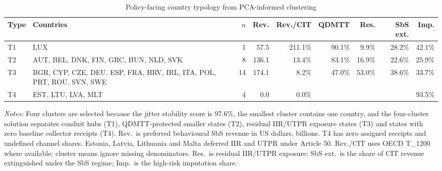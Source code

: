 \begin{table}[H]
\centering
\scriptsize
\setlength{\tabcolsep}{2pt}
\caption[Policy-facing country typology]{Policy-facing country typology from PCA-informed clustering}
\label{tab:country_typology_clusters}
\begin{adjustbox}{max width=\textwidth,center}
\begin{tabular}{@{}L{0.85cm}L{3.35cm}rrrrrrr@{}}
\toprule
Type & Countries & $n$ & Rev. & Rev./CIT & QDMTT & Res. & SbS ext. & Imp. \\
\midrule
T1 & LUX &  1 &  57.5 & 211.1\% & 90.1\% &  9.9\% & 28.2\% & 42.1\% \\
T2 & AUT, BEL, DNK, FIN, GRC, HUN, NLD, SVK &  8 & 136.1 &  13.4\% & 83.1\% & 16.9\% & 22.6\% & 25.9\% \\
T3 & BGR, CYP, CZE, DEU, ESP, FRA, HRV, IRL, ITA, POL, PRT, ROU, SVN, SWE & 14 & 174.1 &   8.2\% & 47.0\% & 53.0\% & 38.6\% & 33.7\% \\
T4 & EST, LTU, LVA, MLT &  4 &   0.0 &   0.0\% &  &  &  & 93.5\% \\
\bottomrule
\end{tabular}
\end{adjustbox}

\vspace{0.35em}
\noindent\begin{minipage}{\textwidth}
\footnotesize\raggedright\textit{Notes:} Four clusters are selected because the jitter stability score is 97.6\%, the smallest cluster contains one country, and the four-cluster solution separates conduit hubs (T1), QDMTT-protected smaller states (T2), residual IIR/UTPR exposure states (T3) and states with zero baseline collector receipts (T4). Rev.\ is preferred behavioural SbS revenue in US dollars, billions. T4 has zero assigned receipts and undefined channel shares. Estonia, Latvia, Lithuania and Malta deferred IIR and UTPR under Article 50. Rev./CIT uses OECD T\_1200 where available; cluster means ignore missing denominators. Res.\ is residual IIR/UTPR exposure; SbS ext.\ is the share of CIT revenue extinguished under the SbS regime; Imp.\ is the high-risk imputation share.
\end{minipage}
\end{table}
